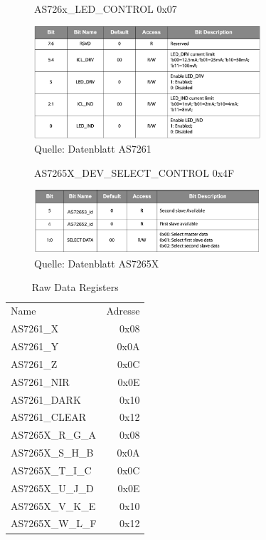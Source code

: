\begin{figure}[H]
\centering
\caption{AS726x\_LED\_CONTROL 0x07}
\includegraphics[width=0.75\textwidth]{img/AS726x_LED_CONTROL}
\caption*{Quelle: Datenblatt AS7261}
\label{fig:AS726x_LED_CONTROL}
\end{figure}

\begin{figure}[H]
\centering
\caption{AS7265X\_DEV\_SELECT\_CONTROL 0x4F}
\includegraphics[width=0.75\textwidth]{img/AS7265X_DEV_SELECT_CONTROL}
\caption*{Quelle: Datenblatt AS7265X}
\label{fig:AS7265X_DEV_SELECT_CONTROL}
\end{figure}

\begin{table}[!ht]
\centering
\caption{Raw Data Registers}
\begin{tabular}{ l r }
 Name & Adresse\\ 
AS7261\_X & 0x08\\
AS7261\_Y & 0x0A\\
AS7261\_Z & 0x0C\\
AS7261\_NIR & 0x0E\\
AS7261\_DARK & 0x10\\
AS7261\_CLEAR & 0x12\\
AS7265X\_R\_G\_A & 0x08 \\
AS7265X\_S\_H\_B & 0x0A \\
AS7265X\_T\_I\_C & 0x0C \\
AS7265X\_U\_J\_D & 0x0E \\
AS7265X\_V\_K\_E & 0x10 \\
AS7265X\_W\_L\_F & 0x12 \\
\end{tabular}
\label{fig:raw_channel_registers}
\end{table}


